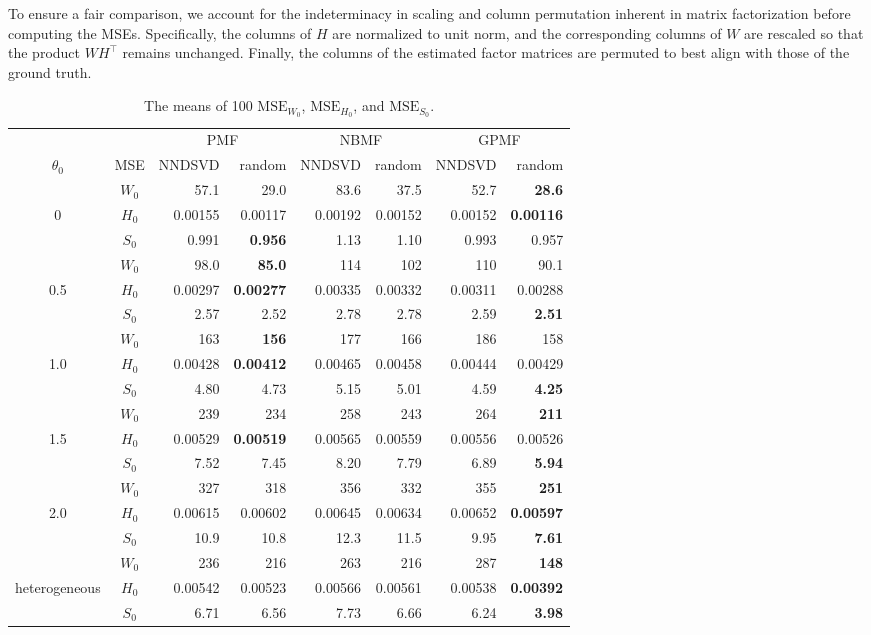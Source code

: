 \documentclass[pdflatex,sn-basic]{sn-jnl}%
\theoremstyle{thmstyleone}%
\theoremstyle{thmstyletwo}%
\theoremstyle{thmstylethree}%
\begin{document}
To ensure a fair comparison, we account for the indeterminacy in scaling and column permutation inherent in matrix factorization before computing the MSEs. Specifically, the columns of $H$ are normalized to unit norm, and the corresponding columns of $W$ are rescaled so that the product $WH^{\top}$ remains unchanged. Finally, the columns of the estimated factor matrices are permuted to best align with those of the ground truth.  

\begin{table}[b]
	\centering
	\caption{The means of 100 $\mathrm{MSE}_{W_{0}}$, $\mathrm{MSE}_{H_{0}}$, and $\mathrm{MSE}_{S_{0}}$.}\label{tab: MSEs}
	\begin{tabular}{ccrrrrrr}
		\toprule
		 & & \multicolumn{2}{c}{PMF} & \multicolumn{2}{c}{NBMF} & \multicolumn{2}{c}{GPMF}\\
		\cmidrule(lr){3-4} \cmidrule(lr){5-6} \cmidrule(lr){7-8}
		$\theta_0$ & MSE & NNDSVD & random & NNDSVD & random & NNDSVD & random \\
		\midrule       
			& $W_{0}$ & 57.1 & 29.0 & 83.6 & 37.5 & 52.7 & \textbf{28.6} \\
		0	& $H_{0}$ & 0.00155 & 0.00117 & 0.00192 & 0.00152 & 0.00152 & \textbf{0.00116} \\
			& $S_{0}$ & 0.991 & \textbf{0.956} & 1.13 & 1.10 & 0.993 & 0.957 \\		
		\midrule
			& $W_{0}$ & 98.0 & \textbf{85.0} & 114 & 102 & 110 & 90.1 \\
		0.5	& $H_{0}$ & 0.00297 & \textbf{0.00277} & 0.00335 & 0.00332 & 0.00311 & 0.00288 \\
			& $S_{0}$ & 2.57 & 2.52 & 2.78 & 2.78 & 2.59 & \textbf{2.51} \\		
		\midrule
			& $W_{0}$ & 163 & \textbf{156} & 177 & 166 & 186 & 158 \\
		1.0	& $H_{0}$ & 0.00428 & \textbf{0.00412} & 0.00465 & 0.00458 & 0.00444 & 0.00429 \\
			& $S_{0}$ & 4.80 & 4.73 & 5.15 & 5.01 & 4.59 & \textbf{4.25} \\		
		\midrule
			& $W_{0}$ & 239 & 234 & 258 & 243 & 264 & \textbf{211} \\
		1.5	& $H_{0}$ & 0.00529 & \textbf{0.00519} & 0.00565 & 0.00559 & 0.00556 & 0.00526 \\
			& $S_{0}$ & 7.52 & 7.45 & 8.20 & 7.79 & 6.89 & \textbf{5.94} \\	
		\midrule
			& $W_{0}$ & 327 & 318 & 356 & 332 & 355 & \textbf{251} \\
		2.0	& $H_{0}$ & 0.00615 & 0.00602 & 0.00645 & 0.00634 & 0.00652 & \textbf{0.00597} \\
			& $S_{0}$ & 10.9 & 10.8 & 12.3 & 11.5 & 9.95 & \textbf{7.61} \\		
		\midrule
			& $W_{0}$ & 236 & 216 & 263 & 216 & 287 & \textbf{148} \\
		heterogeneous	& $H_{0}$ & 0.00542 & 0.00523 & 0.00566 & 0.00561 & 0.00538 & \textbf{0.00392} \\
			& $S_{0}$ & 6.71 & 6.56 & 7.73 & 6.66 & 6.24 & \textbf{3.98} \\		
		\bottomrule
	\end{tabular}
\end{table}
\end{document}
